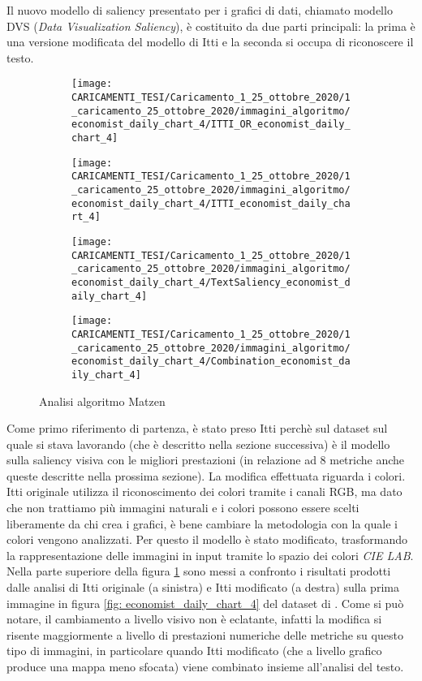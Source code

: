 \documentclass[%
	corpo=12pt,
    twoside,
    stile=classica,
    oldstyle,
    tipotesi=custom,
    greek,
    evenboxes,
]{toptesi}
\begin{document}
{Il nuovo modello di saliency presentato per i grafici di dati, chiamato modello DVS (\textit{Data Visualization Saliency}),  è costituito da due parti principali: la prima è una versione modificata del modello di Itti e la seconda si occupa di riconoscere il testo.
\begin{figure}[!htb]\centering
\begin{subfigure}
\centering
\texttt{[image: CARICAMENTI\_TESI/Caricamento\_1\_25\_ottobre\_2020/1\_caricamento\_25\_ottobre\_2020/immagini\_algoritmo/economist\_daily\_chart\_4/ITTI\_OR\_economist\_daily\_chart\_4]}
\end{subfigure}
\begin{subfigure}
\centering
\texttt{[image: CARICAMENTI\_TESI/Caricamento\_1\_25\_ottobre\_2020/1\_caricamento\_25\_ottobre\_2020/immagini\_algoritmo/economist\_daily\_chart\_4/ITTI\_economist\_daily\_chart\_4]}
\end{subfigure}
\begin{subfigure}
\centering
\texttt{[image: CARICAMENTI\_TESI/Caricamento\_1\_25\_ottobre\_2020/1\_caricamento\_25\_ottobre\_2020/immagini\_algoritmo/economist\_daily\_chart\_4/TextSaliency\_economist\_daily\_chart\_4]}
\end{subfigure}
\begin{subfigure}
\centering
\texttt{[image: CARICAMENTI\_TESI/Caricamento\_1\_25\_ottobre\_2020/1\_caricamento\_25\_ottobre\_2020/immagini\_algoritmo/economist\_daily\_chart\_4/Combination\_economist\_daily\_chart\_4]}
\end{subfigure}
\caption{Analisi algoritmo Matzen}\label{fig: Combination_economist_daily_chart_4}
\end{figure}
Come primo riferimento di partenza, è stato preso Itti perchè sul dataset  sul quale si stava lavorando (che è descritto nella sezione successiva) è il modello sulla saliency visiva con le migliori prestazioni (in relazione ad 8 metriche anche queste descritte nella prossima sezione). 
La modifica effettuata riguarda i colori. Itti originale utilizza il riconoscimento dei colori tramite i canali RGB, ma dato che non trattiamo più immagini naturali e i colori possono essere scelti liberamente da chi crea i grafici, è bene cambiare la metodologia con la quale i colori vengono analizzati. Per questo il modello è stato modificato, trasformando la rappresentazione delle immagini in input tramite lo spazio dei colori \textit{CIE LAB}.
Nella parte superiore della figura \ref{fig: Combination_economist_daily_chart_4} sono messi a confronto i risultati prodotti dalle analisi di Itti originale (a sinistra) e Itti modificato (a destra) sulla prima immagine in figura \ref{fig: economist_daily_chart_4} del dataset di . Come si può notare, il cambiamento a livello visivo non è eclatante, infatti la modifica si risente maggiormente a livello di prestazioni numeriche delle metriche su questo tipo di immagini, in particolare quando Itti modificato (che a livello grafico produce una mappa meno sfocata) viene combinato insieme all'analisi del testo. 

}
\end{document}
